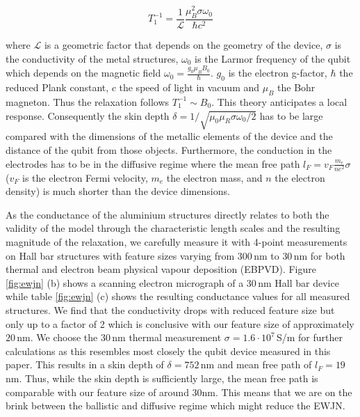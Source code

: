 \begin{equation}
T_1^{-1}=\frac{1}{\mathcal{L}}\frac{\mu_B^2\sigma\omega_0}{\hbar c^2}
\end{equation}

where $\mathcal{L}$ is a geometric factor that depends on the geometry of the device, $\sigma$ is the conductivity of the metal structures, $\omega_0$ is the Larmor frequency of the qubit which depends on the magnetic field $\omega_0=\frac{g_0\mu_B B_0}{\hbar}$. $g_0$ is the electron g-factor, $\hbar$ the reduced Plank constant, $c$ the speed of light in vacuum and $\mu_B$ the Bohr magneton. Thus the relaxation follows $T_1^{-1}\sim B_0$. This theory anticipates a local response. Consequently the skin depth $\delta=1/\sqrt{\mu_0\mu_R\sigma\omega_0/2}$ has to be large compared with the dimensions of the metallic elements of the device and the distance of the qubit from those objects. Furthermore, the conduction in the electrodes has to be in the diffusive regime where the mean free path $l_F=v_F\frac{m_e}{ne^2}\sigma$ ($v_F$ is the electron Fermi velocity, $m_e$ the electron mass, and $n$ the electron density) is much shorter than the device dimensions.  

As the conductance of the aluminium structures directly relates to both the validity of the model through the characteristic length scales and the resulting magnitude of the relaxation, we carefully measure it with 4-point measurements on Hall bar structures with feature sizes varying from $300\,$nm to $30\,$nm for both thermal and electron beam physical vapour deposition (EBPVD). Figure \ref{fig:ewjn} (b) shows a scanning electron micrograph of a $30\,$nm Hall bar device while table \ref{fig:ewjn} (c) shows the resulting conductance values for all measured structures. 
We find that the conductivity drops with reduced feature size but only up to a factor of 2 which is conclusive with our feature size of approximately $20\,$nm.  We choose the $30\,$nm thermal measurement $\sigma=1.6\cdot 10^7\,$S/m for further calculations as this resembles most closely the qubit device measured in this paper. This results in a skin depth of $\delta=752\,$nm and mean free path of $l_F=19\,$nm. Thus, while the skin depth is sufficiently large, the mean free path is comparable with our feature size of around 30nm. This means that we are on the brink between the ballistic and diffusive regime which might reduce the EWJN.

